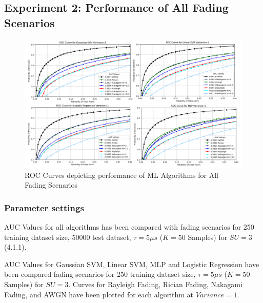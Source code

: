 \subsection{Experiment 2: Performance of All Fading Scenarios}
\begin{figure}
  \begin{center}
  \includegraphics[width=1\textwidth]{figs/1.png}
  \end{center}
  \caption{ROC Curves depicting performance of ML Algorithms for All Fading Scenarios}
\end{figure}

\subsubsection{Parameter settings}
AUC Values for all algorithms has been compared with fading scenarios for 250 training dataset size, 50000 test dataset, $\tau=5\mu s$ ($K=50$ Samples) for $SU=3$ (4.1.1).

AUC Values for Gaussian SVM, Linear SVM, MLP and Logistic Regression have been compared fading scenarios for 250 training dataset size, $\tau=5\mu s$ ($K=50$ Samples) for $SU=3$. Curves for Rayleigh Fading, Rician Fading, Nakagami Fading, and AWGN have been plotted for each algorithm at $Variance=1$.
